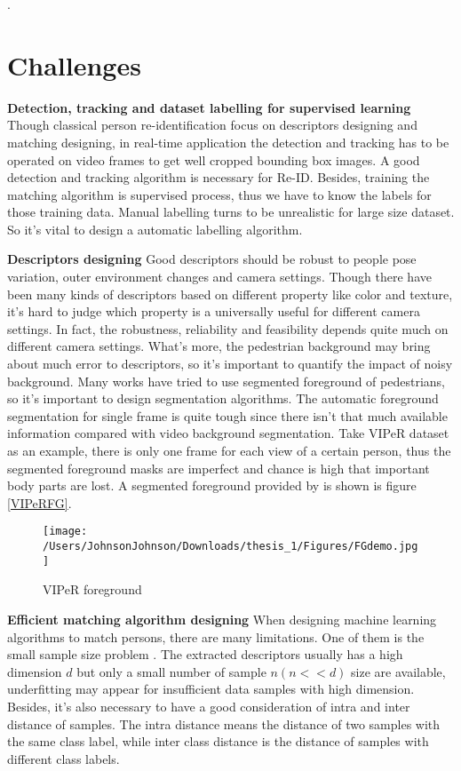 .

\section{Challenges}

\textbf{Detection, tracking and dataset labelling for supervised learning} Though classical person re-identification focus on descriptors designing and matching designing, in real-time application the detection and tracking has to be operated on video frames to get well cropped bounding box images. A good detection and tracking algorithm is necessary for Re-ID. Besides, training the matching algorithm is supervised process, thus we have to know the labels for those training data. Manual labelling turns to be unrealistic for large size dataset. So it's vital to design a automatic labelling algorithm.

\textbf{Descriptors designing} Good descriptors should be robust to people pose variation, outer environment changes and camera settings. Though there have been many kinds of descriptors based on different property like color and texture, it's hard to judge which property is a universally useful for different camera settings. In fact, the robustness, reliability and feasibility depends quite much on different camera settings. What's more, the pedestrian background may bring about much error to descriptors, so it's important to quantify the impact of noisy background. Many works have tried to use segmented foreground of pedestrians, so it's important to design segmentation algorithms. The automatic foreground segmentation for single frame is quite tough since there isn't that much available information compared with video background segmentation. Take VIPeR dataset as an example, there is only one frame for each view of a certain person, thus the segmented foreground masks are imperfect and chance is high that important body parts are lost. A segmented foreground provided by \cite{SDALF} is shown is figure \ref{VIPeRFG}.
\begin{figure}[H]
\centering
\texttt{[image: /Users/JohnsonJohnson/Downloads/thesis\_1/Figures/FGdemo.jpg]}
\vspace{-3em}
\caption{VIPeR foreground}
\end{figure}
\label{VIPeRFG}
\textbf{Efficient matching algorithm designing} 	
When designing machine learning algorithms to match persons, there are many limitations. One of them is the small sample size problem \cite{NFST}. The extracted descriptors usually has a high dimension $d$ but only a small number of sample $n(n<<d)$ size are available, underfitting may appear for insufficient data samples with high dimension. Besides, it's also necessary to have a good consideration of intra and inter distance of samples.
The intra distance means the distance of two samples with the same class label, while inter class distance is the distance of samples with different class labels. 

